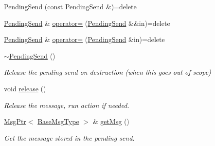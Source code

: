 \begin{DoxyCompactItemize}
\hyperlink{structvt_1_1messaging_1_1_pending_send_a951912c336cf3cdaf91f8ccde13092af}{Pending\+Send} (const \hyperlink{structvt_1_1messaging_1_1_pending_send}{Pending\+Send} \&)=delete
\item 
\hyperlink{structvt_1_1messaging_1_1_pending_send}{Pending\+Send} \& \hyperlink{structvt_1_1messaging_1_1_pending_send_aecef2d10d22564d142b9de52a57d81c8}{operator=} (\hyperlink{structvt_1_1messaging_1_1_pending_send}{Pending\+Send} \&\&in)=delete
\item 
\hyperlink{structvt_1_1messaging_1_1_pending_send}{Pending\+Send} \& \hyperlink{structvt_1_1messaging_1_1_pending_send_addfa1d51e3b8f272b5e711867e893bca}{operator=} (\hyperlink{structvt_1_1messaging_1_1_pending_send}{Pending\+Send} \&in)=delete
\item 
\hyperlink{structvt_1_1messaging_1_1_pending_send_ade803ff2903a92eaf62b6e330593871b}{$\sim$\+Pending\+Send} ()
\begin{DoxyCompactList}\small\item\em Release the pending send on destruction (when this goes out of scope) \end{DoxyCompactList}\item 
void \hyperlink{structvt_1_1messaging_1_1_pending_send_ad4b41412f953dcd22b3e3020a812f757}{release} ()
\begin{DoxyCompactList}\small\item\em Release the message, run action if needed. \end{DoxyCompactList}\item 
\hyperlink{namespacevt_a9f5ebd62ee9d6dd8829e3e1cc4f858e9}{Msg\+Ptr}$<$ \hyperlink{namespacevt_a44d0d4e144748f2b19a1cfd962f50338}{Base\+Msg\+Type} $>$ \& \hyperlink{structvt_1_1messaging_1_1_pending_send_a03c34f8761089680983aa701bce424cc}{get\+Msg} ()
\begin{DoxyCompactList}\small\item\em Get the message stored in the pending send. \end{DoxyCompactList}\end{DoxyCompactItemize}
